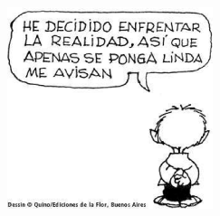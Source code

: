 \documentclass[oneside]{book}
\begin{document}
\chapter*{}
\begin{figure}[h]
	\centering
	\includegraphics[width=6cm, height=6cm]{img/mafalda}

\end{figure}
\end{document}
